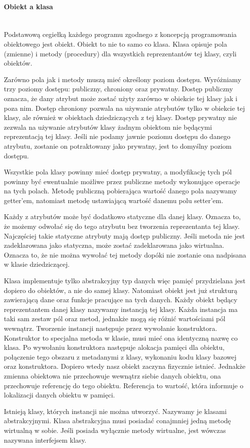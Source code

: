 \paragraph{Obiekt a klasa}\mbox{}\\
Podstawową cegiełką każdego programu zgodnego z koncepcją programowania obiektowego jest obiekt. Obiekt to nie to samo co klasa. Klasa opisuje pola (zmienne) i metody (procedury) dla wszystkich reprezentantów tej klasy, czyli obiektów.\par Zarówno pola jak i metody muszą mieć określony poziom dostępu. Wyróżniamy trzy poziomy dostępu: publiczny, chroniony oraz prywatny. Dostęp publiczny oznacza, że dany atrybut może zostać użyty zarówno w obiekcie tej klasy jak i poza nim. Dostęp chroniony pozwala na używanie atrybutów tylko w obiekcie tej klasy, ale również w obiektach dziedziczących z tej klasy. Dostęp prywatny nie zezwala na używanie atrybutów klasy żadnym obiektom nie będącymi reprezentacją tej klasy. Jeśli nie podamy jawnie poziomu dostępu do danego atrybutu, zostanie on potraktowany jako prywatny, jest to domyślny poziom dostępu.\par Wszystkie pola klasy powinny mieć dostęp prywatny, a modyfikację tych pól powinny być ewentualnie możliwe przez publiczne metody wykonujące operacje na tych polach. Metodę publiczną pobierająca wartość danego pola nazywamy getter'em, natomiast metodę ustawiającą wartość danemu polu setter'em.\par Każdy z atrybutów może być dodatkowo statyczne dla danej klasy. Oznacza to, że możemy odwołać się do tego atrybutu bez tworzenia reprezentanta tej klasy. Najczęściej takie statyczne atrybuty mają dostęp publiczny. Jeśli metoda nie jest zadeklarowana jako statyczna, może zostać zadeklarowana jako wirtualna. Oznacza to, że nie można wywołać tej metody dopóki nie zostanie ona nadpisana w klasie dziedziczącej.\par Klasa implementuje tylko abstrakcyjny typ danych więc pamięć przydzielana jest dopiero do obiektów, a nie do samej klasy. Natomiast obiekt jest już strukturą zawierającą dane oraz funkcje pracujące na tych danych. Każdy obiekt będący reprezentantem danej klasy nazywamy instancją tej klasy. Każda instancja ma taki sam zestaw pól oraz metod, jednakże mogą się różnić wartościami pól wewnątrz. Tworzenie instancji następuje przez wywołanie konstruktora. Konstruktor to specjalna metoda w klasie, musi mieć ona identyczną nazwę co klasa. Po wywołaniu konstruktora następuje alokacja pamięci dla obiektu, połączenie tego obszaru z metadanymi z klasy, wykonaniu kodu klasy bazowej oraz konstruktora. Dopiero wtedy nasz obiekt zaczyna fizycznie istnieć. Jednakże zmienna obiektowa nie przechowuje wewnątrz siebie danych obiektu, ona przechowuje referencję do tego obiektu. Referencja to wartość, która informuje o lokalizacji danych obiektu w pamięci.\par Istnieją klasy, których instancji nie można utworzyć. Nazywamy je klasami abstrakcyjnymi. Klasa abstrakcyjna musi posiadać conajmniej jedną metodę wirtualną w sobie. Jeśli posiada wyłącznie metody wirtualne, jest wówczas nazywana interfejsem klasy.


